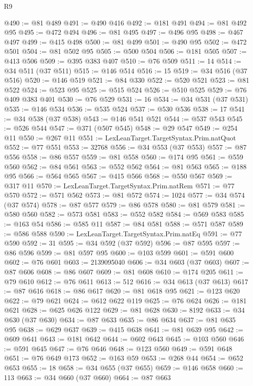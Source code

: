 \begin{lexlean}{R9}
\begin{coremodule}
@490 := @81 @489
@491 := @490 @416
@492 := @181 @491
@494 := @81 @492 @95
@495 := @472 @494
@496 := @81 @495
@497 := @496 @95
@498 := @467 @497
@499 := @415 @498
@500 := @81 @499
@501 := @490 @95
@502 := @472 @501
@504 := @81 @502 @95
@505 := @500 @504
@506 := @181 @505
@507 := @413 @506
@509 := @395 @383 @407
@510 := @76 @509
@511 := 14
@514 := @34 @511 (@37 @511)
@515 := @146 @514
@516 := 15
@519 := @34 @516 (@37 @516)
@520 := @146 @519
@521 := @84 @330
@522 := @520 @521
@523 := @81 @522
@524 := @523 @95
@525 := @515 @524
@526 := @510 @525
@529 := @76 @409 @383 @401
@530 := @76 @529
@531 := 16
@534 := @34 @531 (@37 @531)
@535 := @146 @534
@536 := @535 @524
@537 := @530 @536
@538 := 17
@541 := @34 @538 (@37 @538)
@543 := @146 @541 @521
@544 := @537 @543
@545 := @526 @544
@547 := @371 (@507 @545)
@548 := @29 @547
@549 := @254 @11
@550 := @267 @11
@551 := LexLeanTarget.TargetSyntax.Prim.natQuot
@552 := @77 @551
@553 := 32768
@556 := @34 @553 (@37 @553)
@557 := @87 @556
@558 := @86 @557
@559 := @81 @558
@560 := @174 @95
@561 := @559 @560
@562 := @84 @561
@563 := @552 @562
@564 := @81 @563
@565 := @188 @95
@566 := @564 @565
@567 := @415 @566
@568 := @550 @567
@569 := @317 @11
@570 := LexLeanTarget.TargetSyntax.Prim.natRem
@571 := @77 @570
@572 := @571 @562
@573 := @81 @572
@574 := 1024
@577 := @34 @574 (@37 @574)
@578 := @87 @577
@579 := @86 @578
@580 := @81 @579
@581 := @580 @560
@582 := @573 @581
@583 := @552 @582
@584 := @569 @583
@585 := @163 @54
@586 := @585 @11
@587 := @84 @581
@588 := @571 @587
@589 := @586 @588
@590 := LexLeanTarget.TargetSyntax.Prim.natEq
@591 := @77 @590
@592 := 31
@595 := @34 @592 (@37 @592)
@596 := @87 @595
@597 := @86 @596
@599 := @81 @597 @95
@600 := @103 @599
@601 := @591 @600
@602 := @76 @601
@603 := 2139095040
@606 := @34 @603 (@37 @603)
@607 := @87 @606
@608 := @86 @607
@609 := @81 @608
@610 := @174 @205
@611 := @79 @610
@612 := @76 @611
@613 := 512
@616 := @34 @613 (@37 @613)
@617 := @87 @616
@618 := @86 @617
@620 := @81 @618 @95
@621 := @123 @620
@622 := @79 @621
@624 := @612 @622 @119
@625 := @76 @624
@626 := @181 @621
@628 := @625 @626 @122
@629 := @81 @628
@630 := 8192
@633 := @34 @630 (@37 @630)
@634 := @87 @633
@635 := @86 @634
@637 := @81 @635 @95
@638 := @629 @637
@639 := @415 @638
@641 := @81 @639 @95
@642 := @609 @641
@643 := @181 @642
@644 := @602 @643
@645 := @103 @560
@646 := @591 @645
@647 := @76 @646
@648 := @123 @560
@649 := @591 @648
@651 := @76 @649 @173
@652 := @163 @59
@653 := @268 @44
@654 := @652 @653
@655 := 18
@658 := @34 @655 (@37 @655)
@659 := @146 @658
@660 := 113
@663 := @34 @660 (@37 @660)
@664 := @87 @663

\end{coremodule}
\end{lexlean}
